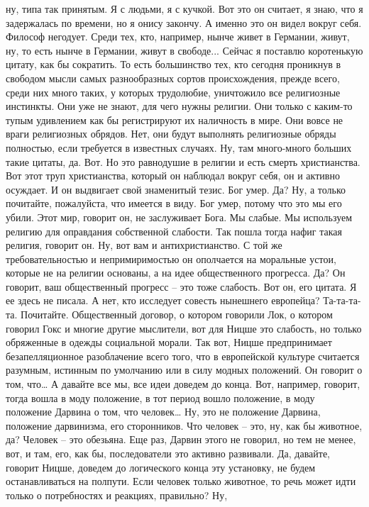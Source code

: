 ну, типа так принятым. Я с людьми, я с кучкой. Вот это он считает, я знаю, что я
задержалась по времени, но я онису закончу. А именно это он видел вокруг себя.
Философ негодует. Среди тех, кто, например, нынче живет в Германии, живут, ну,
то есть нынче в Германии, живут в свободе... Сейчас я поставлю коротенькую
цитату, как бы сократить. То есть большинство тех, кто сегодня проникнув в
свободом мысли самых разнообразных сортов происхождения, прежде всего, среди них
много таких, у которых трудолюбие, уничтожило все религиозные инстинкты. Они уже
не знают, для чего нужны религии. Они только с каким-то тупым удивлением как бы
регистрируют их наличность в мире. Они вовсе не враги религиозных обрядов. Нет,
они будут выполнять религиозные обряды полностью, если требуется в известных
случаях. Ну, там много-много больших такие цитаты, да. Вот. Но это равнодушие в
религии и есть смерть христианства. Вот этот труп христианства, который он
наблюдал вокруг себя, он и активно осуждает. И он выдвигает свой знаменитый
тезис. Бог умер. Да? Ну, а только почитайте, пожалуйста, что имеется в виду. Бог
умер, потому что это мы его убили. Этот мир, говорит он, не заслуживает Бога. Мы
слабые. Мы используем религию для оправдания собственной слабости. Так пошла
тогда нафиг такая религия, говорит он. Ну, вот вам и антихристианство. С той же
требовательностью и непримиримостью он ополчается на моральные устои, которые не
на религии основаны, а на идее общественного прогресса. Да? Он говорит, ваш
общественный прогресс – это тоже слабость. Вот он, его цитата. Я ее здесь не
писала. А нет, кто исследует совесть нынешнего европейца? Та-та-та-та.
Почитайте. Общественный договор, о котором говорили Лок, о котором говорил Гокс
и многие другие мыслители, вот для Ницше это слабость, но только обряженные в
одежды социальной морали. Так вот, Ницше предпринимает безапелляционное
разоблачение всего того, что в европейской культуре считается разумным, истинным
по умолчанию или в силу модных положений. Он говорит о том, что… А давайте все
мы, все идеи доведем до конца. Вот, например, говорит, тогда вошла в моду
положение, в тот период вошло положение, в моду положение Дарвина о том, что
человек… Ну, это не положение Дарвина, положение дарвинизма, его сторонников.
Что человек – это, ну, как бы животное, да? Человек – это обезьяна. Еще раз,
Дарвин этого не говорил, но тем не менее, вот, и там, его, как бы, последователи
это активно развивали. Да, давайте, говорит Ницше, доведем до логического конца
эту установку, не будем останавливаться на полпути. Если человек только
животное, то речь может идти только о потребностях и реакциях, правильно? Ну,
